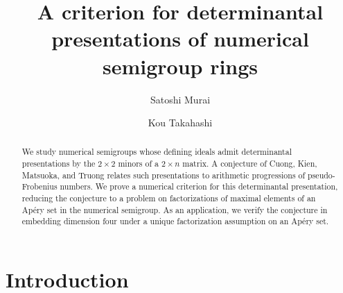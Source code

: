 \documentclass[12pt]{amsart}
\numberwithin{equation}{section}
\theoremstyle{definition}
\begin{document}
\title[A criterion for determinantal presentations]{A criterion for determinantal presentations of numerical semigroup rings}


\author{Satoshi Murai}
\address{
Satoshi Murai,
Department of Mathematics
Faculty of Education
Waseda University,
1-6-1 Nishi-Waseda, Shinjuku, Tokyo 169-8050, Japan}

\author{Kou Takahashi}
\address{
Kou Takahashi,
Department of Mathematics
Faculty of Education
Waseda University,
1-6-1 Nishi-Waseda, Shinjuku, Tokyo 169-8050, Japan}







\begin{abstract}
We study numerical semigroups whose defining ideals admit determinantal presentations by the $2\times2$ minors of a $2\times n$ matrix. A conjecture of Cuong, Kien, Matsuoka, and Truong relates such presentations to arithmetic progressions of pseudo-Frobenius numbers. We prove a numerical criterion for this determinantal presentation, reducing the conjecture to a problem on factorizations of
maximal elements of an Ap\'ery set in the numerical semigroup. As an application, we verify the conjecture in embedding dimension four under a unique factorization assumption on an Ap\'ery set.
\end{abstract}


\maketitle




\section{Introduction}
\end{document}
